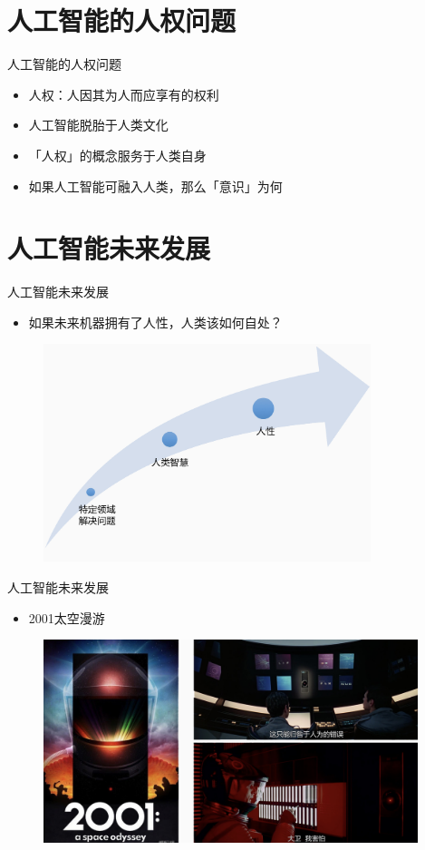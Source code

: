 \documentclass{beamer}
\begin{document}
  \section{人工智能的人权问题}
  \begin{frame}{人工智能的人权问题}
    \begin{itemize}
     \item 人权：人因其为人而应享有的权利
     \item 人工智能脱胎于人类文化
     \item 「人权」的概念服务于人类自身  
     \item 如果人工智能可融入人类，那么「意识」为何
    \end{itemize}
  \end{frame}

  \section{人工智能未来发展}

  \begin{frame}{人工智能未来发展}
    \begin{itemize}
     \item  如果未来机器拥有了人性，人类该如何自处？
    \end{itemize}
   \begin{figure}[H]
   \centering
   \includegraphics[height=2.5in]{cdjPic1.jpg}
   \end{figure}
  \end{frame}
  
   \begin{frame}{人工智能未来发展}
    \begin{itemize}
     \item 2001太空漫游
    \end{itemize}
   \begin{figure}[H]
   \centering
   \includegraphics[width=4.3in]{cdjPic2.jpg}
   \end{figure}
  \end{frame}
\end{document}
